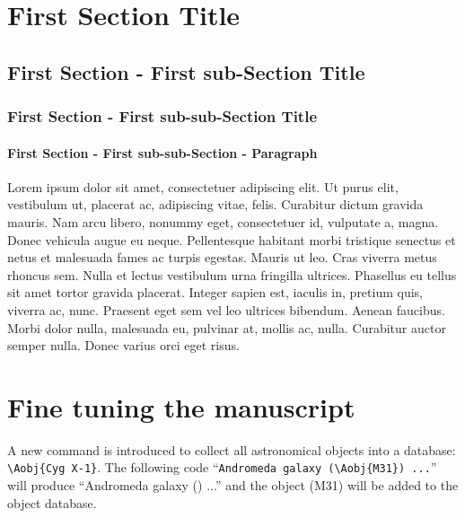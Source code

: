 \documentclass[usenatbib]{tjaa}
\begin{document}
\section{First Section Title}

\lipsum[1]

\subsection{First Section - First sub-Section Title}

\lipsum[1]

\subsubsection{First Section - First sub-sub-Section Title}

\lipsum[1]

\paragraph{First Section - First sub-sub-Section - Paragraph}

Lorem ipsum dolor sit amet, consectetuer adipiscing elit. Ut
purus elit, vestibulum ut, placerat ac, adipiscing vitae, felis.
Curabitur dictum gravida mauris. Nam arcu libero, nonummy
eget, consectetuer id, vulputate a, magna. Donec vehicula
augue eu neque. Pellentesque habitant morbi tristique senectus
et netus et malesuada fames ac turpis egestas. Mauris ut leo.
Cras viverra metus rhoncus sem. Nulla et lectus vestibulum
urna fringilla ultrices. Phasellus eu tellus sit amet tortor gravida
placerat. Integer sapien est, iaculis in, pretium quis, viverra ac,
nunc. Praesent eget sem vel leo ultrices bibendum. Aenean
faucibus. Morbi dolor nulla, malesuada eu, pulvinar at, mollis
ac, nulla. Curabitur auctor semper nulla. Donec varius orci eget
risus.


\newpage
\section{Fine tuning the manuscript}

A new command is introduced to collect all astronomical objects into a
database:
\verb|\Aobj{Cyg X-1}|.
The following code
``\verb|Andromeda galaxy (\Aobj{M31}) ...|''
will produce
``Andromeda galaxy () ...''
and the object (M31) will be added to the object database.
\end{document}
